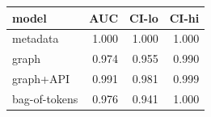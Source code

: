 \begin{tabular}{lrrr}
\toprule
model & AUC & CI-lo & CI-hi \\
\midrule
metadata & 1.000 & 1.000 & 1.000 \\
graph & 0.974 & 0.955 & 0.990 \\
graph+API & 0.991 & 0.981 & 0.999 \\
bag-of-tokens & 0.976 & 0.941 & 1.000 \\
\bottomrule
\end{tabular}
